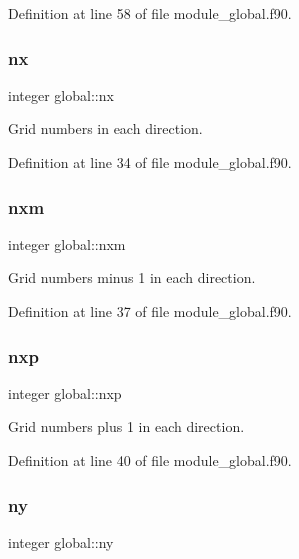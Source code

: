 Definition at line 58 of file module\+\_\+global.\+f90.

\mbox{\label{namespaceglobal_a4ba10a6dbbcebb68e0d5e36a6c291898}} 
\subsubsection{\texorpdfstring{nx}{nx}}
{\footnotesize\ttfamily integer global\+::nx}



Grid numbers in each direction. 



Definition at line 34 of file module\+\_\+global.\+f90.

\mbox{\label{namespaceglobal_aa37f5fe09139707ac1723302127436b1}} 
\subsubsection{\texorpdfstring{nxm}{nxm}}
{\footnotesize\ttfamily integer global\+::nxm}



Grid numbers minus 1 in each direction. 



Definition at line 37 of file module\+\_\+global.\+f90.

\mbox{\label{namespaceglobal_a227001d8177d0295b61a39948436adaa}} 
\subsubsection{\texorpdfstring{nxp}{nxp}}
{\footnotesize\ttfamily integer global\+::nxp}



Grid numbers plus 1 in each direction. 



Definition at line 40 of file module\+\_\+global.\+f90.

\mbox{\label{namespaceglobal_a12dd7ca24c7675f31e6de07b1769991c}} 
\subsubsection{\texorpdfstring{ny}{ny}}
{\footnotesize\ttfamily integer global\+::ny}



